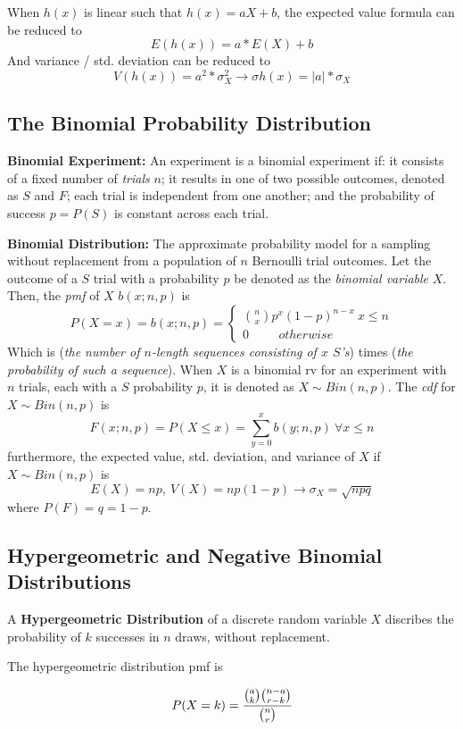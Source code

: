 \documentclass[10pt,twoside,a4paper]{article}
\begin{document}
\begin{multicols*}{2}
\begin{flushleft}
	When $h(x)$ is linear such that $h(x) = aX + b$, the expected value formula
	can be reduced to
	$$E(h(x)) = a * E(X) + b$$
	And variance / std. deviation can be reduced to
	$$V(h(x)) = a^2 * \sigma_{X}^2 \rightarrow \sigma{h(x) = |a| * \sigma_X}$$
	\subsection{The Binomial Probability Distribution}
	\textbf{Binomial Experiment:} An experiment is a binomial experiment if:
	it consists of a fixed number of \textit{trials} $n$; it results in one of two 
	possible outcomes, denoted as $S$ and $F$; each trial is independent from one another;
	and the probability of success $p = P(S)$ is constant across each trial.

	\textbf{Binomial Distribution: } The approximate probability model for a 
	sampling without replacement from a population of $n$ Bernoulli trial outcomes.
	Let the outcome of a $S$ trial with a probability $p$ be denoted as the
	\textit{binomial variable} $X$. Then, the \textit{pmf} of $X$ $b(x; n, p)$ is
	\[
		P(X = x) = b(x; n, p) = 
        \begin{cases}
                \binom{n}{x}p^x(1-p)^{n-x} \ x \leq n \\
                0 \hspace{1cm} otherwise 
        \end{cases}
	\]
	Which is (\textit{the number of $n$-length sequences consisting of $x$ $S$'s}) times 
	(\textit{the probability of such a sequence}). When $X$ is a binomial rv
	for an experiment with $n$ trials, each with a $S$ probability $p$, it is
	denoted as $X \sim Bin(n, p)$. The \textit{cdf} for $X \sim Bin(n, p)$ is
	\[
		F(x; n, p) = P(X \leq x) = \sum^{x}_{y=0} b(y; n, p) \ \forall x \leq n
	\]
	furthermore, the expected value, std. deviation, and variance of $X$ if $X \sim Bin(n, p)$ is
	$$E(X) = np,\ V(X) = np(1-p) \rightarrow \sigma_X = \sqrt{npq}$$
	where $P(F) = q = 1 - p$.
	\subsection{Hypergeometric and Negative Binomial Distributions}

	A \textbf{Hypergeometric Distribution} of a discrete random variable $X$ discribes
	the probability of $k$ successes in $n$ draws, without replacement.

	The hypergeometric distribution pmf is

	$$P(X=k) = \cfrac{ {a \choose k} {n-a \choose r-k} }{ {n \choose r} }$$


\end{flushleft}
\end{multicols*}
\end{document}
